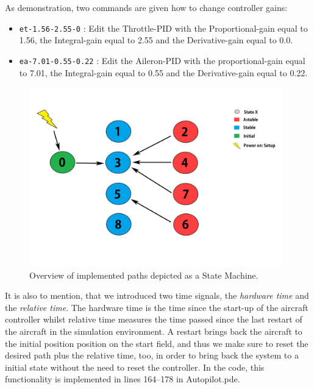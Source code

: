 \documentclass[11pt,a4paper]{scrartcl}		%
\begin{document}
\medskip
\noindent
As demonstration, two commands are given how to change controller gains:
\begin{itemize}
\item 
\texttt{et-1.56-2.55-0} : Edit the Throttle-PID with the Proportional-gain equal to 1.56, the Integral-gain equal to 2.55 and the Derivative-gain equal to 0.0.
\item
\texttt{ea-7.01-0.55-0.22} : Edit the Aileron-PID with the proportional-gain equal to 7.01, the Integral-gain equal to 0.55 and the Derivative-gain equal to 0.22.
\end{itemize}

\begin{figure}[bt]
  \begin{center}
  	\includegraphics[width=11cm]{pictures/StateDiagramme_liason.pdf}
  \end{center}
  \caption{Overview of implemented paths depicted as a State Machine.}
  \label{fig_state-machine}
\end{figure}

\bigskip

It is also to mention, that we introduced two time signals, the \textsl{hardware time} and the \textsl{relative time}.
The hardware time is the time since the start-up of the aircraft controller whilst relative time measures the time passed since the last restart of the aircraft in the simulation environment.
A restart brings back the aircraft to the initial position position on the start field, and thus we make sure to reset the desired path plus the relative time, too, in order to bring back the system to a initial state without the need to reset the controller.
In the code, this functionality is implemented in lines 164--178 in \textsf{Autopilot.pde}.

\medskip
\end{document}
